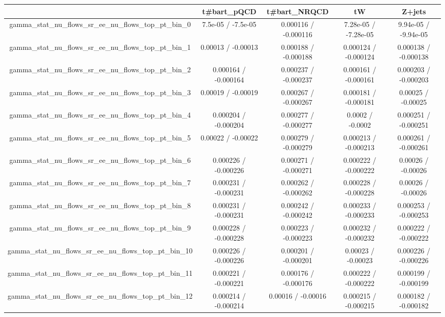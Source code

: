 \documentclass[10pt]{article}
\begin{document}
\begin{table}[htbp]
\begin{center}
\begin{tabular}{|c|c|c|c|c|}
\hline 
      & t#bar{t}_{pQCD}      & t#bar{t}_{NRQCD}      & tW      & Z+jets \\ 
\hline 
  gamma_stat_nu_flows_sr_ee_nu_flows_top_pt_bin_0 & 7.5e-05 / -7.5e-05 & 0.000116 / -0.000116 & 7.28e-05 / -7.28e-05 & 9.94e-05 / -9.94e-05 \\ 
  gamma_stat_nu_flows_sr_ee_nu_flows_top_pt_bin_1 & 0.00013 / -0.00013 & 0.000188 / -0.000188 & 0.000124 / -0.000124 & 0.000138 / -0.000138 \\ 
  gamma_stat_nu_flows_sr_ee_nu_flows_top_pt_bin_2 & 0.000164 / -0.000164 & 0.000237 / -0.000237 & 0.000161 / -0.000161 & 0.000203 / -0.000203 \\ 
  gamma_stat_nu_flows_sr_ee_nu_flows_top_pt_bin_3 & 0.00019 / -0.00019 & 0.000267 / -0.000267 & 0.000181 / -0.000181 & 0.00025 / -0.00025 \\ 
  gamma_stat_nu_flows_sr_ee_nu_flows_top_pt_bin_4 & 0.000204 / -0.000204 & 0.000277 / -0.000277 & 0.0002 / -0.0002 & 0.000251 / -0.000251 \\ 
  gamma_stat_nu_flows_sr_ee_nu_flows_top_pt_bin_5 & 0.00022 / -0.00022 & 0.000279 / -0.000279 & 0.000213 / -0.000213 & 0.000261 / -0.000261 \\ 
  gamma_stat_nu_flows_sr_ee_nu_flows_top_pt_bin_6 & 0.000226 / -0.000226 & 0.000271 / -0.000271 & 0.000222 / -0.000222 & 0.00026 / -0.00026 \\ 
  gamma_stat_nu_flows_sr_ee_nu_flows_top_pt_bin_7 & 0.000231 / -0.000231 & 0.000262 / -0.000262 & 0.000228 / -0.000228 & 0.00026 / -0.00026 \\ 
  gamma_stat_nu_flows_sr_ee_nu_flows_top_pt_bin_8 & 0.000231 / -0.000231 & 0.000242 / -0.000242 & 0.000233 / -0.000233 & 0.000253 / -0.000253 \\ 
  gamma_stat_nu_flows_sr_ee_nu_flows_top_pt_bin_9 & 0.000228 / -0.000228 & 0.000223 / -0.000223 & 0.000232 / -0.000232 & 0.000222 / -0.000222 \\ 
  gamma_stat_nu_flows_sr_ee_nu_flows_top_pt_bin_10 & 0.000226 / -0.000226 & 0.000201 / -0.000201 & 0.00023 / -0.00023 & 0.000226 / -0.000226 \\ 
  gamma_stat_nu_flows_sr_ee_nu_flows_top_pt_bin_11 & 0.000221 / -0.000221 & 0.000176 / -0.000176 & 0.000222 / -0.000222 & 0.000199 / -0.000199 \\ 
  gamma_stat_nu_flows_sr_ee_nu_flows_top_pt_bin_12 & 0.000214 / -0.000214 & 0.00016 / -0.00016 & 0.000215 / -0.000215 & 0.000182 / -0.000182 \\ 

\end{tabular}
\end{center}
\end{table}
\end{document}
